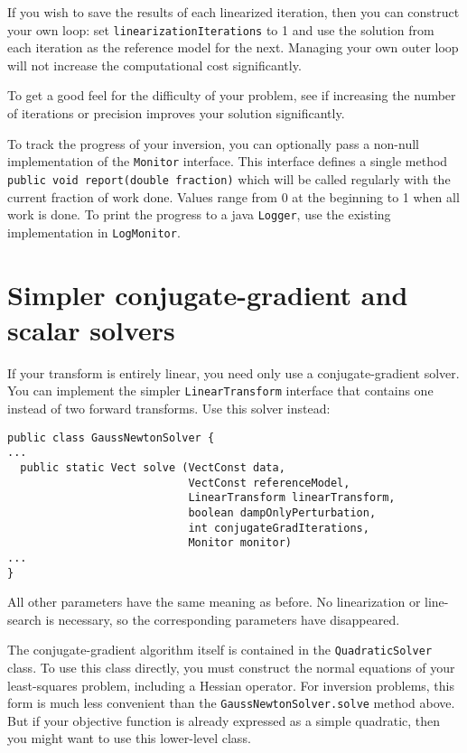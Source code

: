 \documentclass[12pt]{article}
\begin{document}
If you wish to save the results of each
linearized iteration, then you can construct
your own loop: set
\texttt{linearization\-Iterations} to 1 and
use the solution from each iteration as the
reference model for the next.  Managing your
own outer loop will not increase the
computational cost significantly.

To get a good feel for the difficulty of your
problem, see if increasing the number of
iterations or precision improves your
solution significantly.

To track the progress of your inversion, you
can optionally pass a non-null implementation
of the \texttt{Monitor} interface.  This
interface defines a single method
\texttt{public void report(double fraction)}
which will be called regularly with the
current fraction of work done.  Values range
from 0 at the beginning to 1 when all work is
done.  To print the progress to a java
\texttt{Logger}, use the existing
implementation in \texttt{LogMonitor}.

\section {Simpler conjugate-gradient and
scalar solvers}

If your transform is entirely linear, you
need only use a conjugate-gradient solver.
You can implement the simpler
\texttt{LinearTransform} interface that
contains one instead of two forward
transforms.  Use this solver instead:

{\footnotesize \begin{verbatim} 
public class GaussNewtonSolver {
...
  public static Vect solve (VectConst data,
                            VectConst referenceModel,
                            LinearTransform linearTransform,
                            boolean dampOnlyPerturbation,
                            int conjugateGradIterations,
                            Monitor monitor) 
...
}
\end{verbatim}} 

All other parameters have the same meaning as
before.  No linearization or line-search is
necessary, so the corresponding parameters
have disappeared.

The conjugate-gradient algorithm itself is
contained in the
\texttt{Quad\-ra\-tic\-Sol\-ver} class.  To
use this class directly, you must construct
the normal equations of your least-squares
problem, including a Hessian operator.  For
inversion problems, this form is much less
convenient than the
\texttt{Gauss\-Newton\-Solver.solve} method
above.  But if your objective function is
already expressed as a simple quadratic, then
you might want to use this lower-level class.
\end{document}
